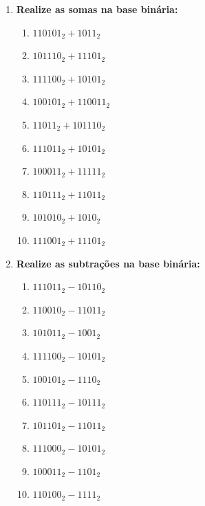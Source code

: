 
\begin{enumerate}


    \item \textbf{Realize as somas na base binária:}
          \begin{enumerate}
              \item $110101_{2} + 1011_{2}$
              \item $101110_{2} + 11101_{2}$
              \item $111100_{2} + 10101_{2}$
              \item $100101_{2} + 110011_{2}$
              \item $11011_{2} + 101110_{2}$
              \item $111011_{2} + 10101_{2}$
              \item $100011_{2} + 11111_{2}$
              \item $110111_{2} + 11011_{2}$
              \item $101010_{2} + 1010_{2}$
              \item $111001_{2} + 11101_{2}$
          \end{enumerate}

    \item \textbf{Realize as subtrações na base binária:}
          \begin{enumerate}
              \item $111011_{2} - 10110_{2}$
              \item $110010_{2} - 11011_{2}$
              \item $101011_{2} - 1001_{2}$
              \item $111100_{2} - 10101_{2}$
              \item $100101_{2} - 1110_{2}$
              \item $110111_{2} - 10111_{2}$
              \item $101101_{2} - 11011_{2}$
              \item $111000_{2} - 10101_{2}$
              \item $100011_{2} - 1101_{2}$
              \item $110100_{2} - 1111_{2}$
          \end{enumerate}


\end{enumerate}
